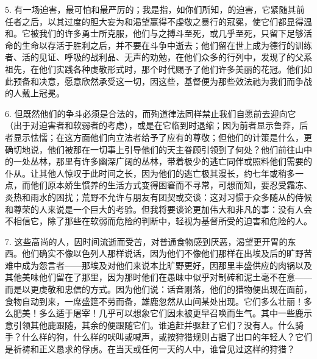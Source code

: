 5. 有一场迫害，最可怕和最严厉的；我是指，如你们所知，的迫害，它紧随其前任者之后，以其过度的胆大妄为和渴望赢得不虔敬之暴行的冠冕，使它们都显得温和。它被我们的许多勇士所克服，他们与之搏斗至死，或几乎至死，只留下足够活命的生命以存活于胜利之后，并不要在斗争中逝去；他们留在世上成为德行的训练者、活的见证、呼吸的战利品、无声的劝勉，在他们众多的行列中，发现了的父系祖先，在他们实践各种虔敬形式时，那个时代赐予了他们许多美丽的花冠。他们如此预备和决意，愿意欣然承受这一切，因这些，基督便为那些效法祂为我们而争战的人戴上冠冕。\par

6. 但既然他们的争斗必须是合法的，而殉道律法同样禁止我们自愿前去迎向它（出于对迫害者和软弱者的考虑），或是在它临到时退缩；因为前者显示鲁莽，后者显示怯懦；在这方面他们向立法者给予了应有的尊敬；但他们的计策是什么，更确切地说，他们被那在一切事上引导他们的天主眷顾引领到了何处？他们前往山中的一处丛林，那里有许多幽深广阔的丛林，带着极少的逃亡同伴或照料他们需要的仆从。让其他人惊叹于此时间之长，因为他们的逃亡极其漫长，约七年或稍多一点，而他们原本娇生惯养的生活方式变得困窘而不寻常，可想而知，要忍受霜冻、炎热和雨水的困扰；荒野不允许与朋友有团契或交谈：这对习惯于众多随从的侍候和尊荣的人来说是一个巨大的考验。但我将要谈论更加伟大和非凡的事：没有人会不相信它，除了那些在软弱而危险的判断中，轻视为基督所受的迫害和危险的人。\par

7. 这些高尚的人，因时间流逝而受苦，对普通食物感到厌恶，渴望更开胃的东西。他们确实不像以色列人那样说话，因为他们不像他们那样在出埃及后的旷野苦难中成为怨言者——那埃及对他们来说本比旷野更好，因那里丰盛供应的肉锅以及其他美味他们留在了那里，因为那时他们在愚昧中似乎对制砖和泥土毫不在意——而是以更虔敬和忠信的方式。因为他们说：话音刚落，他们的猎物便出现在面前，食物自动到来，一席盛筵不劳而备，雄鹿忽然从山间某处出现。它们多么壮丽！多么肥美！多么适于屠宰！几乎可以想象它们因未被更早召唤而生气。其中一些鹿示意引领其他鹿跟随，其余的便跟随它们。谁追赶并驱赶了它们？没有人。什么骑手？什么样的狗，什么样的吠叫或喊声，或按狩猎规则占据了出口的年轻人？它们是祈祷和正义恳求的俘虏。在当天或任何一天的人中，谁曾见过这样的狩猎？\par

